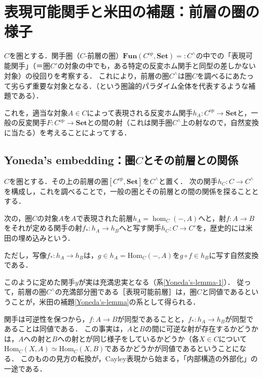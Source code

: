 \documentclass[uplatex, dvipdfmx]{jsreport}
\begin{document}
\section{表現可能関手と米田の補題：前層の圏の様子}
$C$を圏とする．関手圏（$C$-前層の圏）$\mathbf{Fun}(C^{op},\mathbf{Set})=:C^\wedge$の中での「表現可能関手」（＝圏$C'$の対象の中でも，ある特定の反変ホム関手と同型の差しかない対象）の役回りを考察する．
これにより，前層の圏$C^\wedge$は圏$C$を調べるにあたって劣らず重要な対象となる．（という圏論的パラダイム全体を代表するような補題である）．

これを，適当な対象$A\in C$によって表現される反変ホム関手$h_A:C^{op}\to\mathbf{Set}$と，一般の反変関手$F:C^{op}\to\mathbf{Set}$との間の射（これは関手圏$C^\wedge$上の射なので，自然変換に当たる）を考えることによってする．

\subsection{Yoneda's embedding：圏$C$とその前層との関係}

$C$を圏とする．その上の前層の圏$[C^{op},\mathbf{Set}]$を$C^\wedge$と置く．
次の関手$h_C:C\to C^\wedge$を構成し，これを調べることで，一般の圏とその前層との間の関係を探ることとする．

\begin{definition}
    次の，圏$C$の対象$A$を$A$で表現された前層$h_A=\hom_C(-,A)$へと，射$f:A\to B$をそれが定める関手の射$f_*:h_A\to h_B$へと写す関手$h_C:C\to C'$を，歴史的には米田の埋め込みという．
    \begin{center}\end{center}
    ただし，写像$f_*:h_A\to h_B$は，$g\in h_A=\mathrm{Hom}_C(-,A)$を$g\circ f\in h_B$に写す自然変換である．
    
    このように定めた関手$y$が実は充満忠実となる（系\ref{Yoneda's-lemma-1}）．
    従って，前層の圏$C^\wedge$の充満部分圏である［表現可能前層］は，圏$C$と同値であるということが，米田の補題\ref{Yoneda's-lemma}の系として得られる．
    \rightline{$\blacksquare$}
\end{definition}

関手は可逆性を保つから，$f:A\to B$が同型であることと，$f_*:h_A\to h_B$が同型であることは同値である．
この事実は，$A$と$B$の間に可逆な射が存在するかどうかは，$A$への射と$B$への射とが同じ様子をしているかどうか（各$X\in C$について$\mathrm{Hom}_C(X,A)\simeq \mathrm{Hom}_C(X,B)$であるかどうかが同値であるということになる．
このものの見方の転換が，Cayley表現から始まる，「内部構造の外部化」の一途である．
\end{document}
